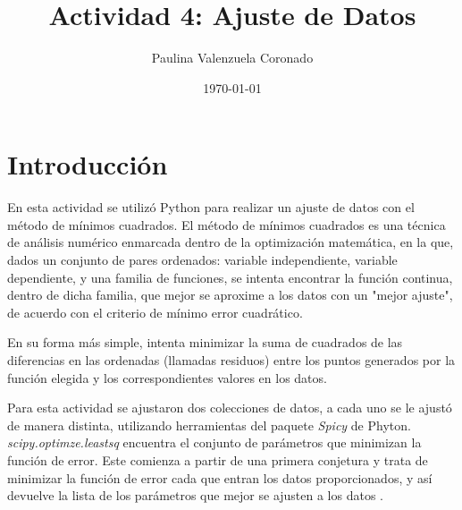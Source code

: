\documentclass[a4paper]{article}
\title{Actividad 4: Ajuste de Datos}
\author{Paulina Valenzuela Coronado}
\date{\today}
\begin{document}
\maketitle

\section{Introducción}
En esta actividad se utilizó Python para realizar un ajuste de datos con el método de mínimos cuadrados. 
El método de mínimos cuadrados es una técnica de análisis numérico enmarcada dentro de la optimización matemática, en la que, dados un conjunto de pares ordenados: variable independiente, variable dependiente, y una familia de funciones, se intenta encontrar la función continua, dentro de dicha familia, que mejor se aproxime a los datos con un "mejor ajuste", de acuerdo con el criterio de mínimo error cuadrático.\cite{P}

En su forma más simple, intenta minimizar la suma de cuadrados de las diferencias en las ordenadas (llamadas residuos) entre los puntos generados por la función elegida y los correspondientes valores en los datos.

Para esta actividad se ajustaron dos colecciones de datos, a cada uno se le ajustó de manera distinta, utilizando herramientas del paquete \textit{Spicy} de Phyton.
\textit{scipy.optimze.leastsq} encuentra el conjunto de parámetros que minimizan la función de error. Este comienza a partir de una primera conjetura y trata de minimizar la función de error cada que entran los datos proporcionados, y así devuelve la lista de los parámetros que mejor se ajusten a los datos \cite{A}. 
\end{document}
